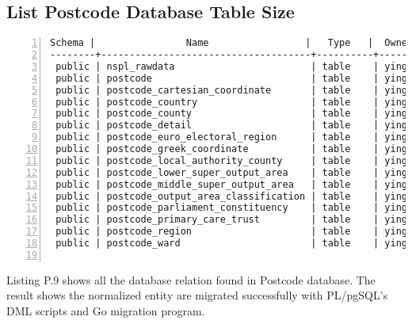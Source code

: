 \subsection{List Postcode Database Table Size}
\lstset{basicstyle=\ttfamily\tiny}  
\begin{lstlisting}[breaklines, frame=single, numbers=left, caption={List size of Postcode normalized table.}, label=commandline-02]
 Schema |                Name                 |   Type   |  Owner  |    Size    | Line Counts 
--------+-------------------------------------+----------+---------+------------+-------------
 public | nspl_rawdata                        | table    | yinghua | 1403 MB    | 1754882
 public | postcode                            | table    | yinghua | 152 MB     | 1754882
 public | postcode_cartesian_coordinate       | table    | yinghua | 70 MB      | 1662088
 public | postcode_country                    | table    | yinghua | 8192 bytes | 7
 public | postcode_county                     | table    | yinghua | 8192 bytes | 34
 public | postcode_detail                     | table    | yinghua | 225 MB     | 1754882
 public | postcode_euro_electoral_region      | table    | yinghua | 8192 bytes | 15
 public | postcode_greek_coordinate           | table    | yinghua | 70 MB      | 1664728
 public | postcode_local_authority_county     | table    | yinghua | 48 kB      | 394
 public | postcode_lower_super_output_area    | table    | yinghua | 2560 kB    | 42460
 public | postcode_middle_super_output_area   | table    | yinghua | 528 kB     | 8484
 public | postcode_output_area_classification | table    | yinghua | 8192 bytes | 77
 public | postcode_parliament_constituency    | table    | yinghua | 64 kB      | 653
 public | postcode_primary_care_trust         | table    | yinghua | 40 kB      | 200
 public | postcode_region                     | table    | yinghua | 8192 bytes | 15
 public | postcode_ward                       | table    | yinghua | 544 kB     | 9115


\end{lstlisting}

Listing P.9 shows all the database relation found in Postcode database. The result shows the normalized entity are migrated successfully with PL/pgSQL's DML scripts and Go migration program.

